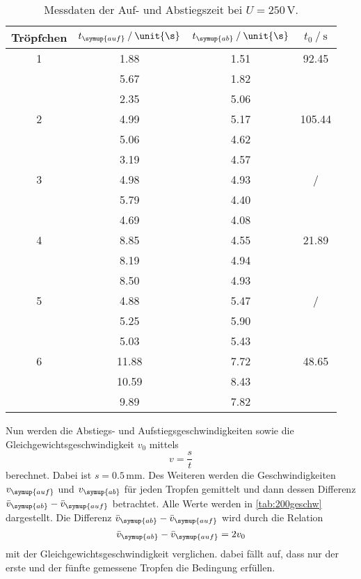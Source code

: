 \begin{table}
    \centering
    \caption{Messdaten der Auf- und Abstiegszeit bei $U=250\,\unit{\V}$.}
\begin{tabular}{c c c c}
    \toprule
        Tröpfchen &$t_{\symup{auf}} \mathbin{/} \unit{\s}$ & $t_{\symup{ab}}\mathbin{/} \unit{\s}$ & $t_0 \mathbin{/}\unit{\s}$ \\
    \midrule
    1&1.88&1.51&92.45 \\
    &5.67&1.82& \\
    &2.35&5.06& \\
2&4.99&5.17&105.44 \\
    &5.06&4.62& \\
    &3.19&4.57& \\
  3&4.98&4.93&/ \\
     &5.79&4.40& \\
    &4.69&4.08& \\
4&8.85&4.55&21.89 \\
    &8.19&4.94& \\
     &8.50&4.93& \\
  5&4.88&5.47&/ \\
     &5.25&5.90& \\
    &5.03&5.43& \\
6&11.88&7.72&48.65 \\
   &10.59&8.43& \\
    &9.89&7.82& \\
    \bottomrule
    \end{tabular}
    \label{tab:250}
\end{table}

\newpage
Nun werden die Abstiegs- und Aufstiegsgeschwindigkeiten sowie die Gleichgewichtsgeschwindigkeit $v_0$ mittels
\begin{equation*}
    v=\frac{s}{t}
\end{equation*} 
berechnet. Dabei ist $s=0.5\,\unit{\milli\m}$. Des Weiteren werden die Geschwindigkeiten $v_{\symup{auf}}$ und $v_{\symup{ab}}$ für jeden Tropfen gemittelt und dann
dessen Differenz $\bar{v}_{\symup{ab}}-\bar{v}_{\symup{auf}}$ betrachtet. Alle Werte werden in \autoref{tab:200geschw} dargestellt. 
Die Differenz $\bar{v}_{\symup{ab}}-\bar{v}_{\symup{auf}}$ wird durch die Relation
\begin{equation}
    \bar{v}_{\symup{ab}}-\bar{v}_{\symup{auf}} = 2v_0
    \label{eqn:gültigkeit}
\end{equation}
mit der Gleichgewichtsgeschwindigkeit verglichen. dabei fällt auf, dass nur der erste und der fünfte gemessene Tropfen die Bedingung erfüllen. 



